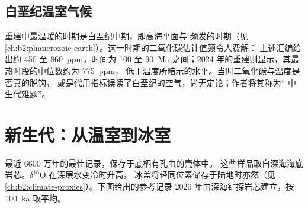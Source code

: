 \subsection*{白垩纪温室气候}

重建中最温暖的时期是白垩纪中期，即高海平面与
频发的时期（见\cref{ch:b2:phanerozoic-earth}）。这一时期的二氧化碳估计值颇令人费解：
上述汇编给出约 450 至 \qty{860}{ppm}，时间为 100 至
\qty{90}{Ma} 之间；2024 年的重建则显示，其最热时段的中位数约为 \qty{775}{ppm}，
低于温度所暗示的水平。当时二氧化碳与温度是否真的脱钩，
或是代用指标误读了白垩纪的空气，尚无定论；作者将其称为“
中生代难题”。

\section{新生代：从温室到冰室}\label{sec:b2:deep-time-climate:cenozoic}

最近 6600 万年的最佳记录，保存于底栖有孔虫的壳体中，
这些样品取自深海海底岩芯。$\delta^{18}$O 在深层水变冷时升高，
冰盖将轻同位素储存于陆地时亦然（见\cref{ch:b2:climate-proxies}）。下图给出的参考记录
2020 年由深海钻探岩芯建立，按 \qty{100}{ka} 取平均。

